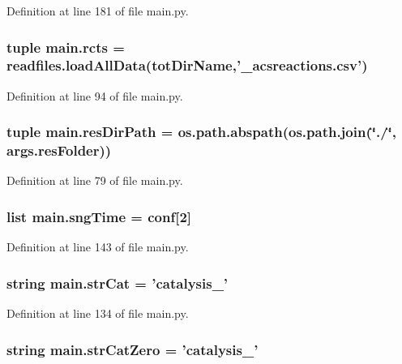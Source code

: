 Definition at line 181 of file main.\-py.

\hypertarget{a00117_ac2fe1ed3228b8e616f25ccfbe4cc7dc4}{
\subsubsection[{rcts}]{\setlength{\rightskip}{0pt plus 5cm}tuple main.\-rcts = readfiles.\-load\-All\-Data({\bf tot\-Dir\-Name},'\-\_\-acsreactions.\-csv')}}\label{a00117_ac2fe1ed3228b8e616f25ccfbe4cc7dc4}


Definition at line 94 of file main.\-py.

\hypertarget{a00117_a93d7d68ada532b3cedaab103283ab91a}{
\subsubsection[{res\-Dir\-Path}]{\setlength{\rightskip}{0pt plus 5cm}tuple main.\-res\-Dir\-Path = os.\-path.\-abspath(os.\-path.\-join(\char`\"{}./\char`\"{}, args.\-res\-Folder))}}\label{a00117_a93d7d68ada532b3cedaab103283ab91a}


Definition at line 79 of file main.\-py.

\hypertarget{a00117_ab4296f1ae2e4c4bb597ca27e84849510}{
\subsubsection[{sng\-Time}]{\setlength{\rightskip}{0pt plus 5cm}list main.\-sng\-Time = {\bf conf}\mbox{[}2\mbox{]}}}\label{a00117_ab4296f1ae2e4c4bb597ca27e84849510}


Definition at line 143 of file main.\-py.

\hypertarget{a00117_ab12df661b7defb4d7077777ad7d6352d}{
\subsubsection[{str\-Cat}]{\setlength{\rightskip}{0pt plus 5cm}string main.\-str\-Cat = 'catalysis\-\_\-'}}\label{a00117_ab12df661b7defb4d7077777ad7d6352d}


Definition at line 134 of file main.\-py.

\hypertarget{a00117_a6bb1e2c0e0d0a9e63313c082ee4eec76}{
\subsubsection[{str\-Cat\-Zero}]{\setlength{\rightskip}{0pt plus 5cm}string main.\-str\-Cat\-Zero = 'catalysis\-\_\-'}}\label{a00117_a6bb1e2c0e0d0a9e63313c082ee4eec76}


